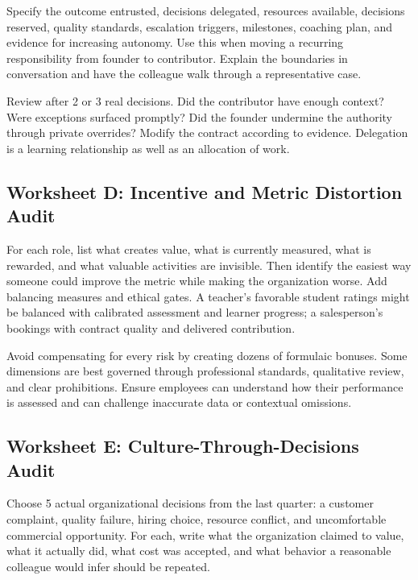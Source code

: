 Specify the outcome entrusted, decisions delegated, resources available, decisions reserved, quality standards, escalation triggers, milestones, coaching plan, and evidence for increasing autonomy. Use this when moving a recurring responsibility from founder to contributor. Explain the boundaries in conversation and have the colleague walk through a representative case.

Review after 2 or 3 real decisions. Did the contributor have enough context? Were exceptions surfaced promptly? Did the founder undermine the authority through private overrides? Modify the contract according to evidence. Delegation is a learning relationship as well as an allocation of work.

\subsection{Worksheet D: Incentive and Metric Distortion Audit}
\label{sec:worksheet_incentive_distortion_audit}

For each role, list what creates value, what is currently measured, what is rewarded, and what valuable activities are invisible. Then identify the easiest way someone could improve the metric while making the organization worse. Add balancing measures and ethical gates. A teacher's favorable student ratings might be balanced with calibrated assessment and learner progress; a salesperson's bookings with contract quality and delivered contribution.

Avoid compensating for every risk by creating dozens of formulaic bonuses. Some dimensions are best governed through professional standards, qualitative review, and clear prohibitions. Ensure employees can understand how their performance is assessed and can challenge inaccurate data or contextual omissions.

\subsection{Worksheet E: Culture-Through-Decisions Audit}
\label{sec:worksheet_culture_decisions_audit}

Choose 5 actual organizational decisions from the last quarter: a customer complaint, quality failure, hiring choice, resource conflict, and uncomfortable commercial opportunity. For each, write what the organization claimed to value, what it actually did, what cost was accepted, and what behavior a reasonable colleague would infer should be repeated.

